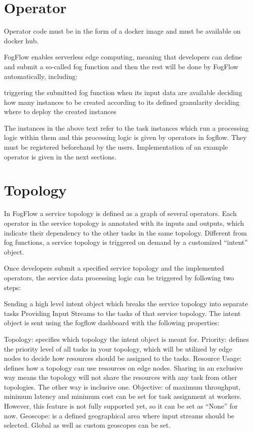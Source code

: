 \documentclass[conference]{ieeeconf}
\begin{document}
\section{Operator}
Operator code must be in the form of a docker image and must be available on docker hub.

FogFlow enables serverless edge computing, meaning that developers can define and submit a so-called fog function and then the rest will be done by FogFlow automatically, including:

triggering the submitted fog function when its input data are available
deciding how many instances to be created according to its defined granularity
deciding where to deploy the created instances

The instances in the above text refer to the task instances which run a processing logic within them and this processing logic is given by operators in fogflow. They must be registered beforehand by the users. Implementation of an example operator is given in the next sections.

\section{Topology}
In FogFlow a service topology is defined as a graph of several operators. Each operator in the service topology is annotated with its inputs and outputs, which indicate their dependency to the other tasks in the same topology. Different from fog functions, a service topology is triggered on demand by a customized “intent” object.

Once developers submit a specified service topology and the implemented operators, the service data processing logic can be triggered by following two steps:

Sending a high level intent object which breaks the service topology into separate tasks
Providing Input Streams to the tasks of that service topology.
The intent object is sent using the fogflow dashboard with the following properties:

Topology: specifies which topology the intent object is meant for.
Priority: defines the priority level of all tasks in your topology, which will be utilized by edge nodes to decide how resources should be assigned to the tasks.
Resource Usage: defines how a topology can use resources on edge nodes. Sharing in an exclusive way means the topology will not share the resources with any task from other topologies. The other way is inclusive one.
Objective: of maximum throughput, minimum latency and minimum cost can be set for task assignment at workers. However, this feature is not fully supported yet, so it can be set as “None” for now.
Geoscope: is a defined geographical area where input streams should be selected. Global as well as custom geoscopes can be set.
\end{document}
